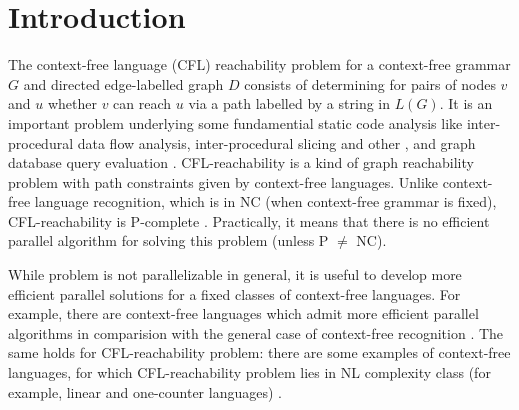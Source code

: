 \documentclass[smallextended]{svjour3}       %
\begin{document}
\section{Introduction}
\label{intro}
The context-free language (CFL) reachability problem for a context-free grammar $G$ and directed edge-labelled graph $D$ consists of determining for pairs of nodes  $v$ and $u$ whether $v$ can reach $u$ via a path labelled by a string in $L(G)$. It is an important problem underlying some fundamential static code analysis like inter-procedural data flow analysis, inter-procedural slicing and other \cite*{Chatterjee, Incremental, RepsBasic}, and graph database query evaluation \cite*{Azimov, GrigorevRagozina, HellingsCFPQ, RDF}. CFL-reachability is a kind of graph reachability problem with path constraints given by context-free languages. Unlike context-free language recognition, which is in NC (when context-free grammar is fixed), CFL-reachability is P-complete \cite*{ RepSeq, Yannakakis}. Practically, it means that there is no efficient parallel algorithm for solving this problem (unless P $\neq$ NC). 


While problem is not parallelizable in general, it is useful to develop more efficient parallel solutions for a fixed classes of context-free languages. For example, there are context-free languages which admit more efficient parallel algorithms in comparision with the general case of context-free recognition \cite*{IBARRA, IBARRA2, Okhotin2014ComplexityOI}.  The same holds for CFL-reachability problem: there are some examples of context-free languages, for which CFL-reachability problem lies in NL complexity class (for example, linear and one-counter languages) \cite*{LabelledGraphs, LReach, Regularrealizability}. 
\end{document}
